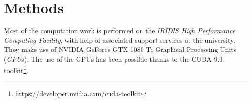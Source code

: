 \chapter{Methods} \label{Chapter: Methods}






Most of the computation work is performed on the \textit{IRIDIS High Performance Computing Facility}, with help of associated support services at the university. They make use of NVIDIA\textregistered$ $ GeForce GTX 1080 Ti Graphical Processing Units (\textit{GPU}s). The use of the GPUs has been possible thanks to the CUDA 9.0 toolkit\footnote{\url{https://developer.nvidia.com/cuda-toolkit}}.

